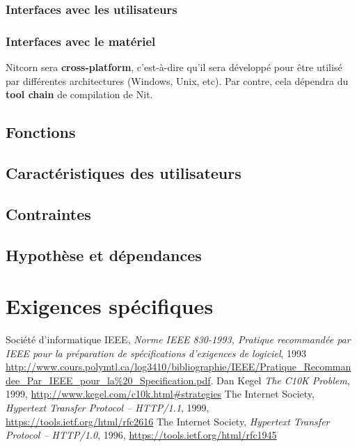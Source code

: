 \documentclass{scrreprt}
\begin{document}
\subsection{Interfaces avec les utilisateurs}

\subsection{Interfaces avec le matériel}
Nitcorn sera \textbf{cross-platform}, c'est-à-dire qu'il sera développé pour être utilisé
par différentes architectures (Windows, Unix, etc). Par contre, cela dépendra
du \textbf{tool chain} de compilation de Nit. 

\section{Fonctions}
\section{Caractéristiques des utilisateurs}
\section{Contraintes}
\section{Hypothèse et dépendances}
\chapter{Exigences spécifiques}

\begin{thebibliography}{9}
  Société d'informatique IEEE,
  \emph{Norme IEEE 830-1993, Pratique recommandée par IEEE pour la préparation de spécifications d’exigences de logiciel}, 1993 \url{http://www.cours.polymtl.ca/log3410/bibliographie/IEEE/Pratique_Recommandee_Par_IEEE_pour_la%20_Specification.pdf}.
  Dan Kegel
  \emph{The C10K Problem}, 1999, \url{http://www.kegel.com/c10k.html#strategies}
    The Internet Society,
    \emph{Hypertext Transfer Protocol -- HTTP/1.1}, 1999, \url{https://tools.ietf.org/html/rfc2616}
    The Internet Society,
    \emph{Hypertext Transfer Protocol -- HTTP/1.0}, 1996, \url{https://tools.ietf.org/html/rfc1945}
\end{thebibliography}


\end{document}
